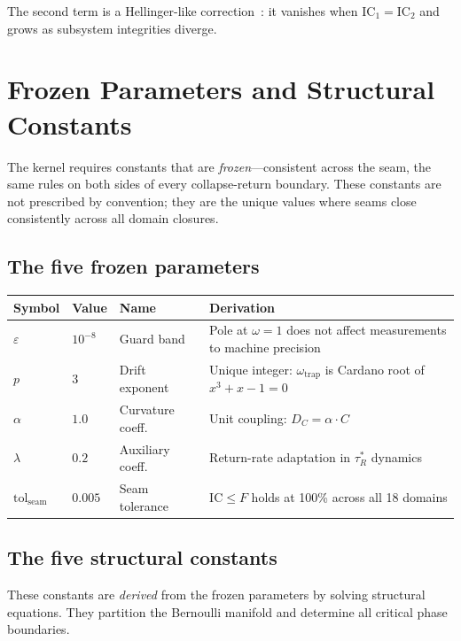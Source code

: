 \documentclass[
  aps,
  prd,
  twocolumn,
  superscriptaddress,
  nofootinbib,
  floatfix
]{revtex4-2}
\newcommand{\tRS}{\tau_{\!R}^{*}}
\newcommand{\eps}{\varepsilon}
\newcommand{\tolseam}{\mathrm{tol}_{\mathrm{seam}}}
\newcommand{\IC}{\mathrm{IC}}
\begin{document}
\noindent The second term is a Hellinger-like
correction~\cite{hellinger1909}: it vanishes when
$\IC_1 = \IC_2$ and grows as subsystem integrities diverge.


\section{Frozen Parameters and Structural Constants}
\label{sec:frozen}

The kernel requires constants that are \emph{frozen}---consistent
across the seam, the same rules on both sides of every
collapse-return boundary.  These constants are not prescribed by
convention; they are the unique values where seams close
consistently across all domain closures.

\subsection{The five frozen parameters}

\begin{center}
{\small\begin{tabular}{@{}lllp{3.2cm}@{}}
\toprule
\textbf{Symbol} & \textbf{Value} & \textbf{Name} & \textbf{Derivation} \\
\midrule
$\eps$ & $10^{-8}$ & Guard band & Pole at $\omega=1$ does not affect measurements to machine precision \\
$p$ & $3$ & Drift exponent & Unique integer: $\omega_{\mathrm{trap}}$ is Cardano root of $x^3+x-1=0$ \\
$\alpha$ & $1.0$ & Curvature coeff.\ & Unit coupling: $D_C = \alpha \cdot C$ \\
$\lambda$ & $0.2$ & Auxiliary coeff.\ & Return-rate adaptation in $\tRS$ dynamics \\
$\tolseam$ & $0.005$ & Seam tolerance & $\IC \leq F$ holds at 100\% across all 18 domains \\
\bottomrule
\end{tabular}}
\end{center}

\subsection{The five structural constants}

These constants are \emph{derived} from the frozen parameters by
solving structural equations.  They partition the Bernoulli manifold
and determine all critical phase boundaries.
\end{document}
